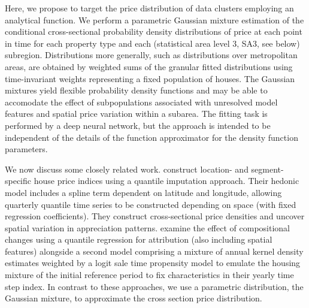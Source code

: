 Here, we propose to target the price distribution of data clusters employing an analytical function. We perform a parametric Gaussian mixture estimation of the conditional cross-sectional probability density distributions of price at each point in time for each property type and each (statistical area level 3, SA3, see below) subregion.  Distributions more generally, such as distributions over metropolitan areas, are obtained by weighted sums of the granular fitted distributions using time-invariant weights representing a fixed population of houses. The Gaussian mixtures yield flexible probability density functions and may be able to accomodate the effect of subpopulations associated with unresolved model features and spatial price variation within a subarea. The fitting task is performed by a deep neural network, but the approach is intended to be independent of the details of the function approximator for the density function parameters.

We now discuss some closely related work. \cite{waltl2019} construct location- and segment-specific house price indices using a quantile imputation approach. Their hedonic model includes a spline term dependent on latitude and longitude, allowing quarterly quantile time series to be constructed depending on space (with fixed regression coefficients).
They construct cross-sectional price densities and uncover spatial variation in appreciation patterns.
\citet{mcmillen_shimizu2021} examine the effect of compositional changes using a quantile regression for attribution (also including spatial features) alongside a second model comprising a mixture of annual kernel density estimates weighted by a logit sale time propensity model to emulate the housing mixture of the initial reference period to fix characteristics \citep{hill_melser2008} in their yearly time step index. In contrast to these approaches, we use a parametric distribution, the Gaussian mixture, to approximate the cross section price distribution.

